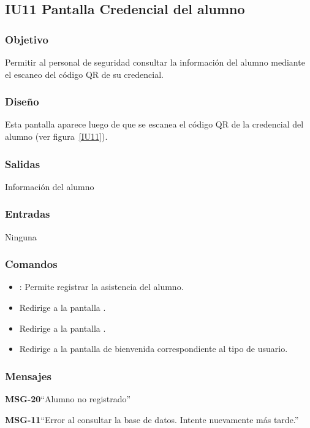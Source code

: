 \subsection{IU11 Pantalla Credencial del alumno}

\subsubsection{Objetivo}
	Permitir al personal de seguridad consultar la información del alumno mediante el escaneo del código QR de su credencial.

\subsubsection{Diseño}
Esta pantalla aparece luego de que se escanea el código QR de la credencial del alumno  (ver figura~\ref{IU11}).
	


\subsubsection{Salidas}
	Información del alumno

\subsubsection{Entradas}
Ninguna

\subsubsection{Comandos}
\begin{itemize}
	\item {}: Permite registrar la asistencia del alumno.
	\item {} Redirige a la pantalla .
    \item {} Redirige a la pantalla .
    \item {} Redirige a la pantalla de bienvenida correspondiente al tipo de usuario.
\end{itemize}

\subsubsection{Mensajes}

\begin{Citemize}
	\item {\bf MSG-20}{``Alumno no registrado''}
	\item {\bf MSG-11}{``Error al consultar la base de datos. Intente nuevamente más tarde.''}
\end{Citemize}

